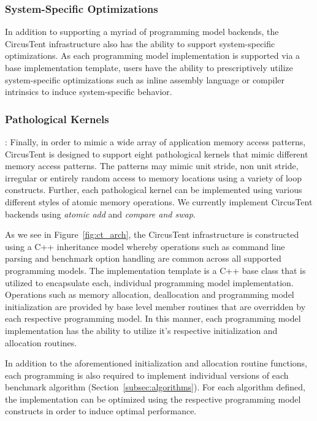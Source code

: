 \subsubsection*{System-Specific Optimizations} In addition to supporting a myriad of programming model backends, the CircusTent infrastructure also has the ability to support system-specific optimizations.  As each programming model implementation is supported via a base implementation template, users have the ability to prescriptively utilize system-specific optimizations such as inline assembly language or compiler intrinsics to induce system-specific behavior.

\subsubsection*{Pathological Kernels}:  Finally, in order to mimic a wide array of application memory access patterns, CircusTent is designed to support eight pathological kernels that mimic different memory access patterns.  The patterns may mimic unit stride, non unit stride, irregular or entirely random access to memory locations using a variety of loop constructs.  Further, each pathological kernel can be implemented using various different styles of atomic memory operations.  We currently implement CircusTent backends using \textit{atomic add} and \textit{compare and swap}.    

As we see in Figure~\ref{fig:ct_arch}, the CircusTent infrastructure is constructed 
using a C++ inheritance model whereby operations such as command line parsing 
and benchmark option handling are common across all supported programming models.  The 
implementation template is a C++ base class that is utilized to encapsulate each, individual 
programming model implementation.  Operations such as memory allocation, deallocation and 
programming model initialization are provided by base level member routines that are overridden by each respective programming model.  In this manner, each programming model
implementation has the ability to utilize it's respective initialization and allocation routines.

In addition to the aforementioned initialization and allocation routine functions, each 
programming is also required to implement individual versions of each benchmark algorithm 
(Section~\ref{subsec:algorithms}).  For each algorithm defined, the implementation 
can be optimized using the respective programming model constructs in order to induce 
optimal performance.    

